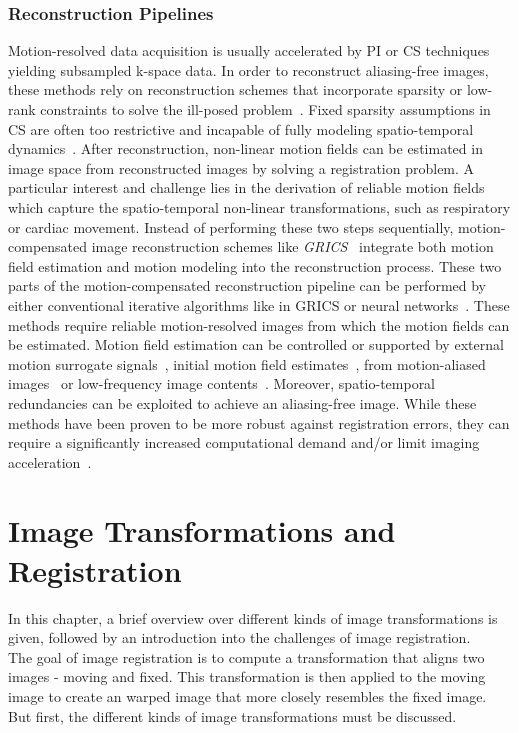 \subsubsection{Reconstruction Pipelines} \label{SubSubSec:ReconstructionPipelines}
Motion-resolved data acquisition is usually accelerated by PI or CS techniques yielding subsampled k-space data. In order to reconstruct aliasing-free images, these methods rely on reconstruction schemes that incorporate sparsity or low-rank constraints to solve the ill-posed problem~\cite{CS-MRI,ParallelMRI,LowRank+SparseMRI}. Fixed sparsity assumptions in CS are often too restrictive and incapable of fully modeling spatio-temporal dynamics~\cite{Kuestner2022}. After reconstruction, non-linear motion fields can be estimated in image space from reconstructed images by solving a registration problem. A particular interest and challenge lies in the derivation of reliable motion fields which capture the spatio-temporal non-linear transformations, such as respiratory or cardiac movement. Instead of performing these two steps sequentially, motion-compensated image reconstruction schemes like \emph{GRICS}~\cite{GRICS} integrate both motion field estimation and motion modeling into the reconstruction process. These two parts of the motion-compensated reconstruction pipeline can be performed by either conventional iterative algorithms like in GRICS or neural networks~\cite{Kuestner2022}. These methods require reliable motion-resolved images from which the motion fields can be estimated. Motion field estimation can be controlled or supported by external motion surrogate signals~\cite{CorderoGrande2016}, initial motion field estimates~\cite{Atkinson1997,Batchelor2005}, from motion-aliased images~\cite{Haskell2019} or low-frequency image contents~\cite{Usman2020}. Moreover, spatio-temporal redundancies can be exploited to achieve an aliasing-free image. While these methods have been proven to be more robust against registration errors, they can require a significantly increased computational demand and/or limit imaging acceleration~\cite{Kuestner2022}. 


\section{Image Transformations and Registration} \label{Sec:ImageTransformationsAndRegistration}
In this chapter, a brief overview over different kinds of image transformations is given, followed by an introduction into the challenges of image registration.\\
The goal of image registration is to compute a transformation that aligns two images - moving and fixed. This transformation is then applied to the moving image to create an warped image that more closely resembles the fixed image. But first, the different kinds of image transformations must be discussed.


